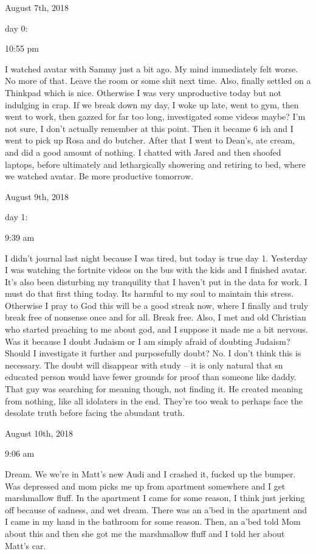 \bigskip
\bigskip
August 7th, 2018

day 0:

10:55 pm

I watched avatar with Sammy just a bit ago. My mind immediately felt
worse. No more of that. Leave the room or some shit next time. Also,
finally settled on a Thinkpad which is nice. Otherwise I was very
unproductive today but not indulging in crap. If we break down my day, I
woke up late, went to gym, then went to work, then gazzed for far too
long, investigated some videos maybe? I'm not sure, I don't actually
remember at this point. Then it became 6 ish and I went to pick up Rosa
and do butcher. After that I went to Dean's, ate cream, and did a good
amount of nothing. I chatted with Jared and then shoofed laptops, before
ultimately and lethargically showering and retiring to bed, where we
watched avatar. Be more productive tomorrow.

\bigskip
\bigskip
August 9th, 2018

day 1:

9:39 am

I didn't journal last night because I was tired, but today is true day
1. Yesterday I was watching the fortnite videos on the bus with the kids
and I finished avatar. It's also been disturbing my tranquility that I
haven't put in the data for work. I must do that first thing today. Its
harmful to my soul to maintain this stress. Otherwise I pray to God this
will be a good streak now, where I finally and truly break free of
nonsense once and for all. Break free. Also, I met and old Christian who
started preaching to me about god, and I suppose it made me a bit
nervous. Was it because I doubt Judaism or I am simply afraid of
doubting Judaism? Should I investigate it further and purposefully
doubt? No. I don't think this is necessary. The doubt will disappear
with study -- it is only natural that sn educated person would have
fewer grounds for proof than someone like daddy. That guy was searching
for meaning though, not finding it. He created meaning from nothing,
like all idolaters in the end. They're too weak to perhaps face the
desolate truth before facing the abundant truth.

\bigskip
\bigskip
August 10th, 2018

9:06 am

Dream. We we're in Matt's new Audi and I crashed it, fucked up the
bumper. Was depressed and mom picks me up from apartment somewhere and I
get marshmallow fluff. In the apartment I came for some reason, I think
just jerking off because of sadness, and wet dream. There was an a'bed
in the apartment and I came in my hand in the bathroom for some reason.
Then, an a'bed told Mom about this and then she got me the marshmallow
fluff and I told her about Matt's car.

